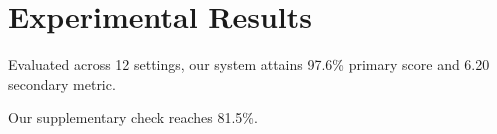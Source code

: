 \section{Experimental Results}\label{sec:results}

Evaluated across 12 settings, our system attains 97.6\% primary score and 6.20 secondary metric.

Our supplementary check reaches 81.5\%.
